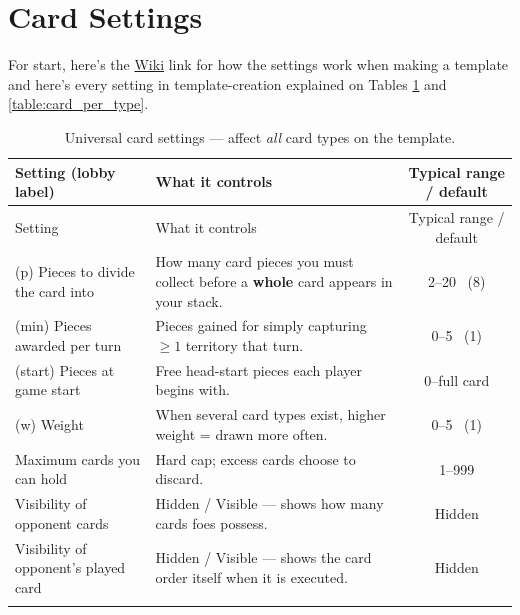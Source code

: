 \section{Card Settings}

For start, here's the \href{https://www.warzone.com/wiki/Card_minimums}{Wiki} link for how the settings work when making a template and here's every setting in template-creation explained on Tables \ref{table:card_globals} and \ref{table:card_per_type}.

\scriptsize
\begin{longtable}{|l|p{7.3cm}|c|}
\hline
\rowcolor{Baby_Blue}
Setting (lobby label) & What it controls & Typical range / default \\ \hline\hline
\endfirsthead
\hline
\rowcolor{Baby_Blue}
Setting & What it controls & Typical range / default \\ \hline\hline
\endhead
(p) Pieces to divide the card into      & How many card pieces you must collect before a \textbf{whole} card appears in your stack. & 2–20 \ (8) \\ \hline
(min) Pieces awarded per turn             & Pieces gained for simply capturing \(\ge\!1\) territory that turn. & 0–5 \ (1) \\ \hline
(start) Pieces at game start                & Free head-start pieces each player begins with. & 0–full card \\ \hline
(w) Weight                              & When several card types exist, higher weight = drawn more often. & 0–5 \ (1) \\ \hline
Maximum cards you can hold          & Hard cap; excess cards choose to discard.          & 1–999 \\ \hline
Visibility of opponent cards        & Hidden / Visible — shows how many cards foes possess. & Hidden \\ \hline
Visibility of opponent’s played card      & Hidden / Visible — shows the card order itself when it is executed. & Hidden \\ \hline
\caption{Universal card settings — affect \emph{all} card types on the template.}
\label{table:card_globals}
\end{longtable}
\normalsize



